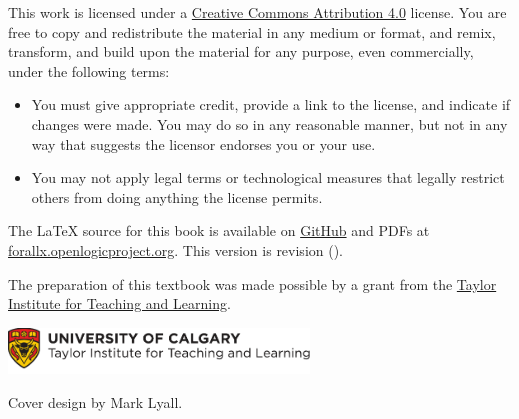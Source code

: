 \bigskip

\noindent \footnotesize This work is licensed under a \href{https://creativecommons.org/licenses/by/4.0/}{Creative Commons Attribution 4.0} license. 
You are free to copy and redistribute the material in any medium or format, and  remix, transform, and build upon the material for any purpose, even commercially, under the following terms:
\begin{itemize}
\item You must give appropriate credit, provide a link to the license, and indicate if changes were made. You may do so in any reasonable manner, but not in any way that suggests the licensor endorses you or your use.
\item You may not apply legal terms or technological measures that legally restrict others from doing anything the license permits.
\end{itemize}

\vfil\normalsize\noindent The \LaTeX{} source for this book is
available on \href{https://github.com/rzach/forallx-yyc/}{GitHub} and
PDFs at
\href{https://forallx.openlogicproject.org}{forallx.openlogicproject.org}.
This version is revision \gitAbbrevHash{} (\gitAuthorDate).

\bigskip
\noindent The preparation of this textbook was made possible by a grant from the \href{https://taylorinstitute.ucalgary.ca/}{Taylor Institute for Teaching and Learning}.

\bigskip
\noindent
\href{https://taylorinstitute.ucalgary.ca/}{\includegraphics[width=8cm]{assets/ti-color}}

\bigskip
\noindent Cover design by Mark Lyall.